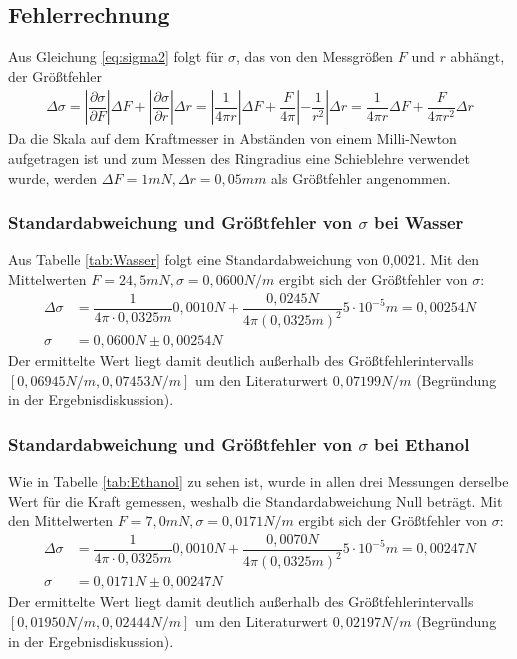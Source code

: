 \documentclass{scrartcl}
\begin{document}
\subsection{Fehlerrechnung}
Aus Gleichung \ref{eq:sigma2} folgt für $\sigma$, das von den Messgrößen $F$ und $r$ abhängt, der Größtfehler
\begin{align*}
\Delta \sigma = \left| \dfrac{\partial \sigma}{\partial F} \right| \Delta F + \left| \dfrac{\partial \sigma}{\partial r} \right| \Delta r = \left| \dfrac{1}{4 \pi r} \right| \Delta F + \dfrac{F}{4 \pi} \left| - \dfrac{1}{r^2} \right| \Delta r =\dfrac{1}{4 \pi r} \Delta F + \dfrac{F}{4 \pi r^2} \Delta r
\end{align*}
Da die Skala auf dem Kraftmesser in Abständen von einem Milli-Newton aufgetragen ist und zum Messen des Ringradius eine Schieblehre verwendet wurde, werden $\Delta F = 1mN, \Delta r = 0,05mm$ als Größtfehler angenommen.

\subsubsection{Standardabweichung und Größtfehler von $\sigma$ bei Wasser}
Aus Tabelle \ref{tab:Wasser} folgt eine Standardabweichung von 0,0021. Mit den Mittelwerten $F = 24,5mN, \sigma = 0,0600N/m$ ergibt sich der Größtfehler von $\sigma$:
\begin{align*}
\Delta \sigma & = \dfrac{1}{4 \pi \cdot 0,0325m} 0,0010N + \dfrac{0,0245N}{4 \pi (0,0325m)^2} 5 \cdot 10^{-5}m = 0,00254N \\
\sigma & = 0,0600N \pm 0,00254N
\end{align*}
Der ermittelte Wert liegt damit deutlich außerhalb des Größtfehlerintervalls \\$[0,06945N/m, 0,07453N/m]$ um den Literaturwert $0,07199N/m$ (Begründung in der Ergebnisdiskussion).
\subsubsection{Standardabweichung und Größtfehler von $\sigma$ bei Ethanol}
Wie in Tabelle \ref{tab:Ethanol} zu sehen ist, wurde in allen drei Messungen derselbe Wert für die Kraft gemessen, weshalb die Standardabweichung Null beträgt. Mit den Mittelwerten $F = 7,0mN, \sigma = 0,0171N/m$ ergibt sich der Größtfehler von $\sigma$:
\begin{align*}
\Delta \sigma & = \dfrac{1}{4 \pi \cdot 0,0325m} 0,0010N + \dfrac{0,0070N}{4 \pi (0,0325m)^2} 5 \cdot 10^{-5}m = 0,00247N \\
\sigma & = 0,0171N \pm 0,00247N
\end{align*}
Der ermittelte Wert liegt damit deutlich außerhalb des Größtfehlerintervalls \\$[0,01950N/m, 0,02444N/m]$ um den Literaturwert $0,02197N/m$ (Begründung in der Ergebnisdiskussion).
\end{document}
